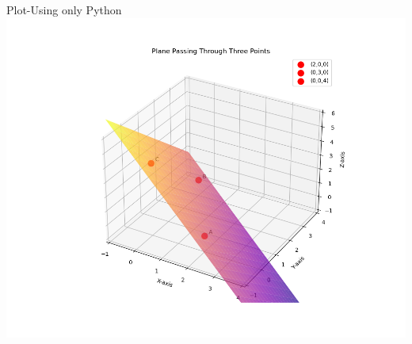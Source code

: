 \documentclass{beamer}
\begin{document}
\begin{frame}{Plot-Using only Python}
    \centering
    \includegraphics[width=\columnwidth, height=0.8\textheight, keepaspectratio]{figs/plane2.png}     
\end{frame}
\end{document}
